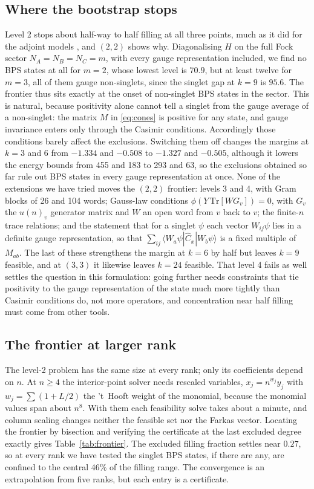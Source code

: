 \documentclass[10pt]{article}
\newcommand{\Tr}{\mathrm{Tr}}
\begin{document}
\subsection{Where the bootstrap stops}

Level 2 stops about half-way to half filling at all three points, much as it did for the adjoint models \cite{R2},
and $(2,2)$ shows why. Diagonalising $H$ on the full Fock sector $N_A=N_B=N_C=m$, with every gauge representation
included, we find no BPS states at all for $m=2$, whose lowest level is $70.9$, but at least twelve for $m=3$, all of
them gauge non-singlets, since the singlet gap at $k=9$ is $95.6$. The frontier thus sits exactly at the onset of
non-singlet BPS states in the sector. This is natural, because positivity alone cannot tell a singlet from the gauge
average of a non-singlet: the matrix $M$ in \eqref{eq:cones} is positive for any state, and gauge invariance enters
only through the Casimir conditions. Accordingly those conditions barely affect the exclusions. Switching them off
changes the margins at $k=3$ and 6 from $-1.334$ and $-0.508$ to $-1.327$ and $-0.505$, although it lowers the energy
bounds from 455 and 183 to 293 and 63, so the exclusions obtained so far rule out BPS states in every gauge
representation at once. None of the extensions we have tried moves the $(2,2)$ frontier: levels 3 and 4, with Gram
blocks of 26 and 104 words; Gauss-law conditions $\phi(Y\,\Tr[WG_v])=0$, with $G_v$ the $u(n)_v$ generator matrix and $W$ an open word
from $v$ back to $v$; the finite-$n$ trace relations; and the statement that for a singlet $\psi$ each vector
$W_{ij}\psi$ lies in a definite gauge representation, so that $\sum_{ij}\langle W_a\psi|\hat C_x|W_b\psi\rangle$ is a
fixed multiple of $M_{ab}$. The last of these strengthens the margin at $k=6$ by half but leaves $k=9$ feasible, and at
$(3,3)$ it likewise leaves $k=24$ feasible. That level 4 fails as well settles the question in this formulation:
going further needs constraints that tie positivity to the gauge representation of the state much more tightly than
Casimir conditions do, not more operators, and concentration near half filling must come from other tools.

\subsection{The frontier at larger rank}

The level-2 problem has the same size at every rank; only its coefficients depend on $n$. At $n\ge4$ the
interior-point solver needs rescaled variables, $x_j=n^{w_j}y_j$ with $w_j=\sum(1+L/2)$ the 't~Hooft weight of the
monomial, because the monomial values span about $n^8$. With them each feasibility solve takes about a minute, and
column scaling changes neither the feasible set nor the Farkas vector. Locating the frontier by bisection and verifying
the certificate at the last excluded degree exactly gives Table~\ref{tab:frontier}. The excluded filling fraction
settles near $0.27$, so at every rank we have tested the singlet BPS states, if there are any, are confined to the
central 46\% of the filling range. The convergence is an extrapolation from five ranks, but each entry is a certificate.
\end{document}
